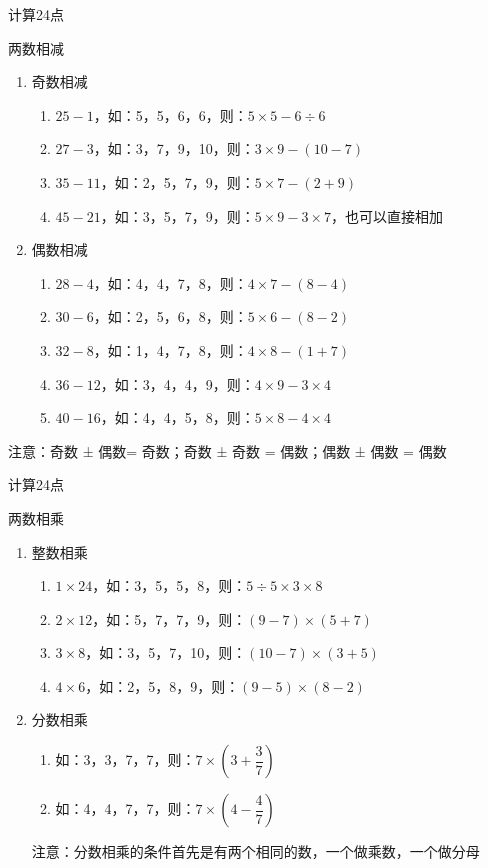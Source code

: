 \documentclass[aspectratio=169]{ctexbeamer} %
\begin{document}
\begin{frame}[t]{计算24点}
\begin{spacing}{1.2}
\normalsize
\alert{两数相减}
\begin{enumerate}[label={\arabic*.}]
\item 奇数相减
	\begin{enumerate}[label={\Alph*.}]
	\item $25 - 1$，如：5，5，6，6，则：$5 \times 5 - 6 \div 6$
	\item $27 - 3$，如：3，7，9，10，则：$3 \times 9 - (10 - 7)$
	\item $35 - 11$，如：2，5，7，9，则：$5 \times 7 - (2 + 9)$	
	\item $45 - 21$，如：3，5，7，9，则：$5 \times 9 - 3 \times 7$，也可以直接相加
	\end{enumerate}
\item 偶数相减
	\begin{enumerate}[label={\Alph*.}]
	\item $28 - 4$，如：4，4，7，8，则：$4 \times 7 - (8 - 4)$
	\item $30 - 6$，如：2，5，6，8，则：$5 \times 6 - (8 - 2)$
	\item $32 - 8$，如：1，4，7，8，则：$4 \times 8 - (1 + 7)$
	\item $36 - 12$，如：3，4，4，9，则：$4 \times 9 - 3 \times 4$
	\item $40 - 16$，如：4，4，5，8，则：$5 \times 8 - 4 \times 4$		
	\end{enumerate}
\end{enumerate}
\alert{注意：奇数 ± 偶数= 奇数；奇数 ± 奇数 = 偶数；偶数 ± 偶数 = 偶数}
\end{spacing}
\end{frame}

\begin{frame}[t]{计算24点}
\begin{spacing}{1.4}
\normalsize
\alert{两数相乘}
\begin{enumerate}[label={\arabic*.}]
\item 整数相乘
	\begin{enumerate}[label={\Alph*.}]
	\item $1 \times 24$，如：3，5，5，8，则：$5 \div 5 \times 3 \times 8$
	\item $2 \times 12$，如：5，7，7，9，则：$(9-7) \times (5+7)$
	\item $3 \times 8$，如：3，5，7，10，则：$(10-7) \times (3+5)$
	\item $4 \times 6$，如：2，5，8，9，则：$(9-5) \times (8-2)$
	\end{enumerate}
\item 分数相乘
	\begin{enumerate}[label={\Alph*.}]
	\item 如：3，3，7，7，则：$7 \times ( 3 + \dfrac{3}{7})$
	\item 如：4，4，7，7，则：$7 \times (4 - \dfrac{4}{7})$
	\end{enumerate}
	\alert{注意：分数相乘的条件首先是有两个相同的数，一个做乘数，一个做分母}
\end{enumerate}
\end{spacing}
\end{frame}
\end{document}
